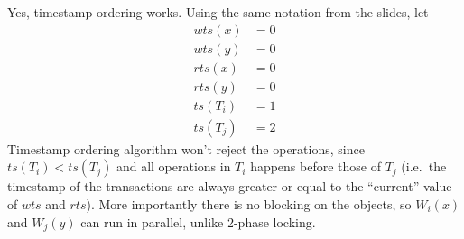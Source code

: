 Yes, timestamp ordering works.
Using the same notation from the slides, let
\begin{align*}
wts(x) &= 0 \\
wts(y) &= 0 \\
rts(x) &= 0 \\
rts(y) &= 0 \\
ts(T_i) &= 1 \\
ts(T_j) &= 2
\end{align*}
Timestamp ordering algorithm won't reject the operations, since $ts(T_i) < ts(T_j)$ and all operations in $T_i$ happens before those of $T_j$ (i.e.\ the timestamp of the transactions are always greater or equal to the ``current'' value of $wts$ and $rts$).
More importantly there is no blocking on the objects, so $W_i(x)$ and $W_j(y)$ can run in parallel, unlike 2-phase locking.
